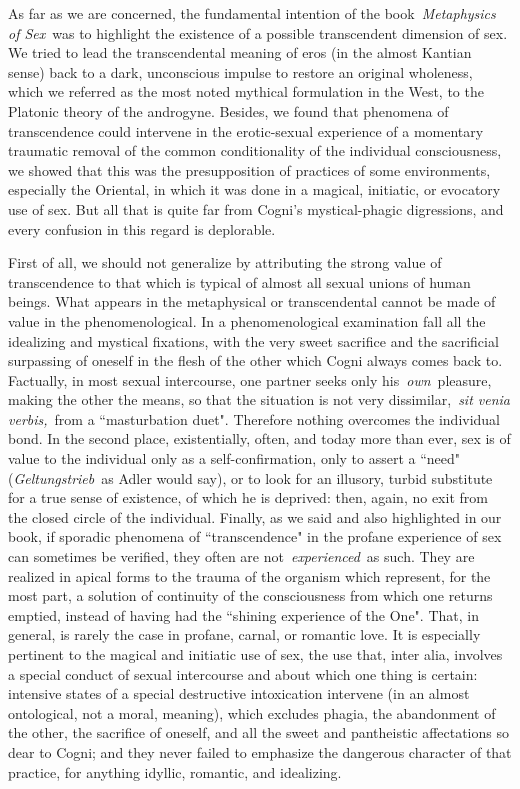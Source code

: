 As far as we are concerned, the fundamental intention of the book \emph{Metaphysics of Sex} was to highlight the
existence of a possible transcendent dimension of sex. We tried to lead the transcendental meaning of eros (in the
almost Kantian sense) back to a dark, unconscious impulse to restore an original wholeness, which we referred as the
most noted mythical formulation in the West, to the Platonic theory of the androgyne. Besides, we found that phenomena
of transcendence could intervene in the erotic-sexual experience of a momentary traumatic removal of the common
conditionality of the individual consciousness, we showed that this was the presupposition of practices of some
environments, especially the Oriental, in which it was done in a magical, initiatic, or evocatory use of sex. But all
that is quite far from Cogni's mystical-phagic digressions, and every confusion in this regard is
deplorable.

First of all, we should not generalize by attributing the strong value of transcendence to that which is typical of
almost all sexual unions of human beings. What appears in the metaphysical or transcendental cannot be made of value in
the phenomenological. In a phenomenological examination fall all the idealizing and mystical fixations, with the very
sweet sacrifice and the sacrificial surpassing of oneself in the flesh of the other which Cogni always comes back to.
Factually, in most sexual intercourse, one partner seeks only his \emph{own} pleasure, making the other the means, so
that the situation is not very dissimilar, \emph{sit venia verbis,} from a ``masturbation duet". Therefore nothing
overcomes the individual bond. In the second place, existentially, often, and today more than ever, sex is of value to
the individual only as a self-confirmation, only to assert a ``need" (\emph{Geltungstrieb} as Adler would say), or to
look for an illusory, turbid substitute for a true sense of existence, of which he is deprived: then, again, no exit
from the closed circle of the individual. Finally, as we said and also highlighted in our book, if sporadic phenomena
of ``transcendence" in the profane experience of sex can sometimes be verified, they often are not \emph{experienced} as
such. They are realized in apical forms to the trauma of the organism which represent, for the most part, a solution of
continuity of the consciousness from which one returns emptied, instead of having had the ``shining experience of the
One". That, in general, is rarely the case in profane, carnal, or romantic love. It is especially pertinent to the
magical and initiatic use of sex, the use that, inter alia, involves a special conduct of sexual intercourse and about
which one thing is certain: intensive states of a special destructive intoxication intervene (in an almost ontological,
not a moral, meaning), which excludes phagia, the abandonment of the other, the sacrifice of oneself, and all the sweet
and pantheistic affectations so dear to Cogni; and they never failed to emphasize the dangerous character of that
practice, for anything idyllic, romantic, and idealizing.

